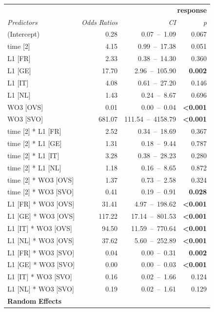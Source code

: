 \begin{table}
    \begin{tabularx}{\textwidth}{lrrr}
    \lsptoprule
    \textbf{~} & \multicolumn{3}{X}{ \textbf{response}}\\
    \textit{Predictors} & \textit{Odds} \textit{Ratios} & \textit{CI} & \textit{p}\\
    \midrule
    (Intercept) & 0.28 & 0.07~–~1.09 & 0.067\\
    time [2] & 4.15 & 0.99~–~17.38 & 0.051\\
    L1 [FR] & 2.33 & 0.38~–~14.30 & 0.360\\
    L1 [GE] & 17.70 & 2.96~–~105.90 & \textbf{0.002}\\
    L1 [IT] & 4.08 & 0.61~–~27.20 & 0.146\\
    L1 [NL] & 1.43 & 0.24~–~8.67 & 0.696\\
    WO3 [OVS] & 0.01 & 0.00~–~0.04 & \textbf{<0.001}\\
    WO3 [SVO] & 681.07 & 111.54~–~4158.79 & \textbf{<0.001}\\
    time [2] * L1 [FR] & 2.52 & 0.34~–~18.69 & 0.367\\
    time [2] * L1 [GE] & 1.31 & 0.18~–~9.44 & 0.787\\
    time [2] * L1 [IT] & 3.28 & 0.38~–~28.23 & 0.280\\
    time [2] * L1 [NL] & 1.18 & 0.16~–~8.65 & 0.872\\
    time [2] * WO3 [OVS] & 1.37 & 0.73~–~2.58 & 0.324\\
    time [2] * WO3 [SVO] & 0.41 & 0.19~–~0.91 & \textbf{0.028}\\
    L1 [FR] * WO3 [OVS] & 31.41 & 4.97~–~198.62 & \textbf{<0.001}\\
    L1 [GE] * WO3 [OVS] & 117.22 & 17.14~–~801.53 & \textbf{<0.001}\\
    L1 [IT] * WO3 [OVS] & 94.50 & 11.59~–~770.64 & \textbf{<0.001}\\
    L1 [NL] * WO3 [OVS] & 37.62 & 5.60~–~252.89 & \textbf{<0.001}\\
    L1 [FR] * WO3 [SVO] & 0.04 & 0.00~–~0.31 & \textbf{0.002}\\
    L1 [GE] * WO3 [SVO] & 0.00 & 0.00~–~0.03 & \textbf{<0.001}\\
    L1 [IT] * WO3 [SVO] & 0.16 & 0.02~–~1.66 & 0.124\\
    L1 [NL] * WO3 [SVO] & 0.19 & 0.02~–~1.61 & 0.129\\
    \multicolumn{4}{X}{\textbf{Random} \textbf{Effects}}\\

\end{tabularx}
\end{table}
